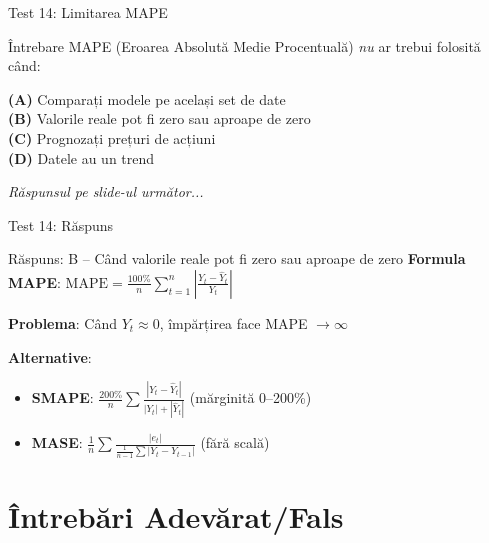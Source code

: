 \documentclass[9pt, aspectratio=169, t]{beamer}
\begin{document}
\begin{frame}{Test 14: Limitarea MAPE}
    \begin{alertblock}{Întrebare}
        MAPE (Eroarea Absolută Medie Procentuală) \emph{nu} ar trebui folosită când:
    \end{alertblock}

    \vspace{0.4cm}

    \textcolor{MainBlue}{\textbf{(A)}} Comparați modele pe același set de date\\[3pt]
    \textcolor{MainBlue}{\textbf{(B)}} Valorile reale pot fi zero sau aproape de zero\\[3pt]
    \textcolor{MainBlue}{\textbf{(C)}} Prognozați prețuri de acțiuni\\[3pt]
    \textcolor{MainBlue}{\textbf{(D)}} Datele au un trend

    \vspace{0.5cm}

    \begin{center}
        \textit{Răspunsul pe slide-ul următor...}
    \end{center}
\end{frame}

\begin{frame}{Test 14: Răspuns}
    \begin{exampleblock}{Răspuns: B -- Când valorile reale pot fi zero sau aproape de zero}
        \textbf{Formula MAPE}: $\text{MAPE} = \frac{100\%}{n}\sum_{t=1}^{n}\left|\frac{Y_t - \hat{Y}_t}{Y_t}\right|$

        \textbf{Problema}: Când $Y_t \approx 0$, împărțirea face MAPE $\to \infty$

        \textbf{Alternative}:
        \begin{itemize}
            \item \textbf{SMAPE}: $\frac{200\%}{n}\sum\frac{|Y_t - \hat{Y}_t|}{|Y_t| + |\hat{Y}_t|}$ (mărginită 0--200\%)
            \item \textbf{MASE}: $\frac{1}{n}\sum\frac{|e_t|}{\frac{1}{n-1}\sum|Y_t - Y_{t-1}|}$ (fără scală)
        \end{itemize}
    \end{exampleblock}
\end{frame}

\section{Întrebări Adevărat/Fals}
\end{document}
